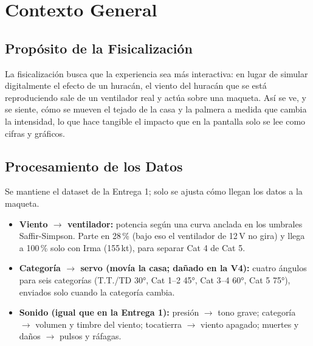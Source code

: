 \documentclass[11pt,a4paper]{article}
\begin{document}
	\vspace{0.2cm}

	\section{Contexto General}

	\subsection{Propósito de la Fisicalización}
	La fisicalización busca que la experiencia sea más interactiva: en lugar de simular digitalmente el efecto de un huracán, el viento del huracán que se está reproduciendo sale de un ventilador real y actúa sobre una maqueta. Así se ve, y se siente, cómo se mueven el tejado de la casa y la palmera a medida que cambia la intensidad, lo que hace tangible el impacto que en la pantalla solo se lee como cifras y gráficos.

	\subsection{Procesamiento de los Datos}
	Se mantiene el dataset de la Entrega 1; solo se ajusta cómo llegan los datos a la maqueta.
	\begin{itemize}
		\item \textbf{Viento $\rightarrow$ ventilador:} potencia según una curva anclada en los umbrales Saffir-Simpson. Parte en 28\,\% (bajo eso el ventilador de 12\,V no gira) y llega a 100\,\% solo con Irma (155\,kt), para separar Cat 4 de Cat 5.
		\item \textbf{Categoría $\rightarrow$ servo (movía la casa; dañado en la V4):} cuatro ángulos para seis categorías (T.T./TD 30°, Cat 1--2 45°, Cat 3--4 60°, Cat 5 75°), enviados solo cuando la categoría cambia.
		\item \textbf{Sonido (igual que en la Entrega 1):} presión $\rightarrow$ tono grave; categoría $\rightarrow$ volumen y timbre del viento; tocatierra $\rightarrow$ viento apagado; muertes y daños $\rightarrow$ pulsos y ráfagas.
	\end{itemize}
\end{document}
